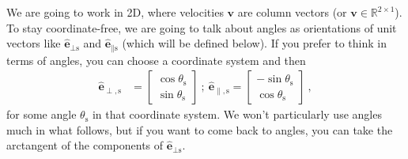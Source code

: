 \documentclass{article}
\renewcommand{\vec}[1]{\boldsymbol{#1}}
\newcommand{\uvec}{\vec{\hat{e}}}
\newcommand{\sail}{\text{s}}
\begin{document}
We are going to work in 2D, where velocities $\vec{v}$ are column vectors (or $\vec{v}\in\mathbb{R}^{2\times 1}$).
To stay coordinate-free, we are going to talk about angles as orientations of unit vectors like $\uvec_{\perp\sail}$ and $\uvec_{\parallel\sail}$ (which will be defined below).
If you prefer to think in terms of angles, you can choose a coordinate system and then
\begin{align}
    \uvec_{\perp,\sail} &= \begin{bmatrix}\cos\theta_\sail \\ \sin\theta_\sail\end{bmatrix} ~ ; ~ \uvec_{\parallel,\sail} = \begin{bmatrix}-\sin\theta_\sail \\ \cos\theta_\sail\end{bmatrix} ~,
\end{align}
for some angle $\theta_\sail$ in that coordinate system.
We won't particularly use angles much in what follows, but if you want to come back to angles, you can take the arctangent of the components of $\uvec_{\perp\sail}$.
\end{document}

